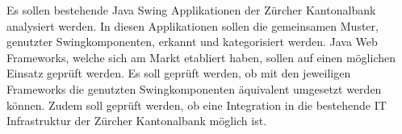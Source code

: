 Es sollen bestehende Java Swing Applikationen der Zürcher Kantonalbank
analysiert werden. In diesen Applikationen sollen die gemeinsamen Muster,
genutzter Swingkomponenten, erkannt und kategorisiert werden. Java Web
Frameworks, welche sich am Markt etabliert haben, sollen auf einen möglichen
Einsatz geprüft werden. Es soll geprüft werden, ob mit den jeweiligen
Frameworks die genutzten Swingkomponenten äquivalent umgesetzt werden können.
Zudem soll geprüft werden, ob eine Integration in die bestehende IT
Infrastruktur der Zürcher Kantonalbank möglich ist.
